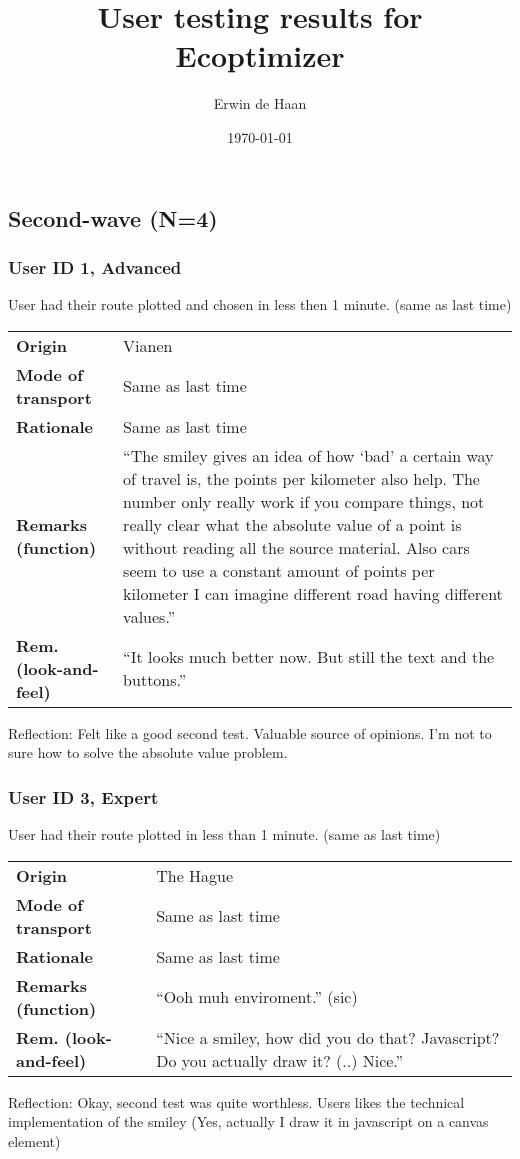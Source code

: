 \documentclass[final,a4paper,11pt]{article}
\author{Erwin de Haan}
\title{User testing results for Ecoptimizer}
\date{\today}
\newlength{\resulttablecolone}
\newlength{\resulttablecoltwo}
\begin{document}
\maketitle

\subsection*{Second-wave (N=4)}
\subsubsection*{User ID 1, Advanced}
User had their route plotted and chosen in less then 1 minute. (same as last time)
\begin{table}[H]
\begin{tabular}{p{\resulttablecolone}|p{\resulttablecoltwo}}
\textbf{Origin} & Vianen \\
\textbf{Mode of transport} & Same as last time \\
\textbf{Rationale} & Same as last time \\
\textbf{Remarks (function)} & ``The smiley gives an idea of how `bad' a certain way of travel is, the points per kilometer also help. The number only really work if you compare things, not really clear what the absolute value of a point is without reading all the source material. Also cars seem to use a constant amount of points per kilometer I can imagine different road having different values.'' \\
\textbf{Rem. (look-and-feel)} & ``It looks much better now. But still the text and the buttons.'' \\
\end{tabular}
\end{table}
Reflection: Felt like a good second test. Valuable source of opinions. I'm not to sure how to solve the absolute value problem.

\subsubsection*{User ID 3, Expert}
User had their route plotted in less than 1 minute. (same as last time)
\begin{table}[H]
\begin{tabular}{p{\resulttablecolone}|p{\resulttablecoltwo}}
\textbf{Origin} & The Hague \\
\textbf{Mode of transport} & Same as last time \\
\textbf{Rationale} & Same as last time \\
\textbf{Remarks (function)} & ``Ooh muh enviroment.'' (sic) \\
\textbf{Rem. (look-and-feel)} & ``Nice a smiley, how did you do that? Javascript? Do you actually draw it? (..) Nice.'' \\
\end{tabular}
\end{table}
Reflection: Okay, second test was quite worthless. Users likes the technical implementation of the smiley (Yes, actually I draw it in javascript on a canvas element)
\end{document}
